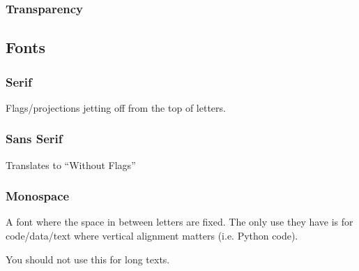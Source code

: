 \subsubsection{Transparency}

\subsection{Fonts}
\subsubsection{Serif}
Flags/projections jetting off from the top of letters.

\subsubsection{Sans Serif}
Translates to ``Without Flags''

\subsubsection{Monospace}
A font where the space in between letters are fixed. The only use they have is for code/data/text where vertical alignment matters (i.e. Python code). 
\begin{important}
    You should not use this for long texts.
\end{important}